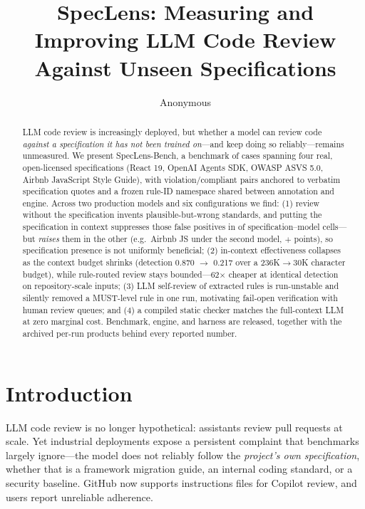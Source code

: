 \documentclass[11pt]{article}
\title{SpecLens: Measuring and Improving LLM Code Review\\Against Unseen Specifications}
\author{Anonymous}
\date{}
\begin{document}
\maketitle

\begin{abstract}
LLM code review is increasingly deployed, but whether a model can review code
\emph{against a specification it has not been trained on}---and keep doing so
reliably---remains unmeasured. We present SpecLens-Bench, a benchmark of \benchN
cases spanning four real, open-licensed specifications (React 19, OpenAI Agents
SDK, OWASP ASVS 5.0, Airbnb JavaScript Style Guide), with violation/compliant
pairs anchored to verbatim specification quotes and a frozen rule-ID namespace
shared between annotation and engine. Across two production models and six
configurations we find: (1) review without the specification invents
plausible-but-wrong standards, and putting the specification in context
suppresses those false positives in \xsFpDown{} of \xsFpCells{}
specification--model cells---but \emph{raises} them in the other \xsFpUp{}
(e.g.\ Airbnb JS under the second model, $+$\xsFpWorstUpVal{} points), so
specification presence is not uniformly beneficial; (2) in-context effectiveness
collapses as the context budget shrinks (detection
0.870 $\rightarrow$ 0.217 over a 236K$\rightarrow$30K character budget), while
rule-routed review stays bounded---62$\times$ cheaper at identical detection on
repository-scale inputs; (3) LLM self-review of extracted rules is run-unstable
and silently removed a MUST-level rule in one run, motivating fail-open
verification with human review queues; and (4) a compiled static checker matches
the full-context LLM at zero marginal cost. Benchmark, engine, and harness are
released, together with the archived per-run products behind every reported
number.
\end{abstract}

\section{Introduction}
LLM code review is no longer hypothetical: assistants review pull requests at
scale. Yet industrial deployments expose a persistent complaint that benchmarks
largely ignore---the model does not reliably follow the \emph{project's own
specification}, whether that is a framework migration guide, an internal coding
standard, or a security baseline. GitHub now supports instructions files for
Copilot review, and users report unreliable adherence.
\end{document}
